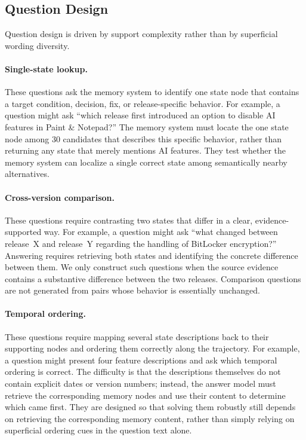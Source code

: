 \subsection{Question Design}

Question design is driven by support complexity rather than by superficial wording diversity.

\paragraph{Single-state lookup.}
These questions ask the memory system to identify one state node that contains a target condition, decision, fix, or release-specific behavior. For example, a question might ask ``which release first introduced an option to disable AI features in Paint \& Notepad?'' The memory system must locate the one state node among 30 candidates that describes this specific behavior, rather than returning any state that merely mentions AI features. They test whether the memory system can localize a single correct state among semantically nearby alternatives.

\paragraph{Cross-version comparison.}
These questions require contrasting two states that differ in a clear, evidence-supported way. For example, a question might ask ``what changed between release~X and release~Y regarding the handling of BitLocker encryption?'' Answering requires retrieving both states and identifying the concrete difference between them. We only construct such questions when the source evidence contains a substantive difference between the two releases. Comparison questions are not generated from pairs whose behavior is essentially unchanged.

\paragraph{Temporal ordering.}
These questions require mapping several state descriptions back to their supporting nodes and ordering them correctly along the trajectory. For example, a question might present four feature descriptions and ask which temporal ordering is correct. The difficulty is that the descriptions themselves do not contain explicit dates or version numbers; instead, the answer model must retrieve the corresponding memory nodes and use their content to determine which came first. They are designed so that solving them robustly still depends on retrieving the corresponding memory content, rather than simply relying on superficial ordering cues in the question text alone.

